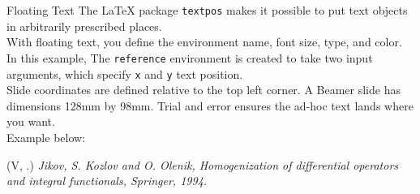 \documentclass[10pt, xcolor=dvipsnames]{beamer}
\newenvironment{reference}[2]{                                    %
  \begin{textblock*}{\textwidth}(#1, #2)
      \tiny\it\bgroup\color{red!70!QPblue}}{\egroup\end{textblock*}}
\begin{document}
\begin{frame}{Floating Text} 
The \LaTeX{} package \texttt{textpos} makes it possible to put text objects in arbitrarily prescribed places.\\[2ex]
 
With floating text, you define the environment name, font size, type, and color.\\[2ex]
 
In this example, The \texttt{reference} environment is created to take two input arguments, which specify \texttt{x} and \texttt{y} text position.\\[2ex]  
 
Slide coordinates are defined relative to the top left corner.  A Beamer slide has dimensions 128mm by 98mm.  Trial and error ensures the ad-hoc text lands where you want.\\[2ex]
 
Example below:
 
\begin{reference}{4mm}{75mm}
      V. Jikov, S. Kozlov and O. Olenik, Homogenization of differential operators and integral functionals, Springer, 1994.
\end{reference} 
\end{frame}
 
 
\end{document}

